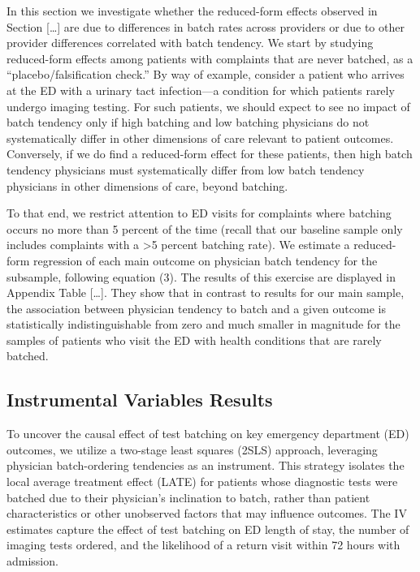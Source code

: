 \documentclass{article}
\begin{document}
In this section we investigate whether the reduced-form effects observed
in Section {[}\ldots{]} are due to differences in batch rates across
providers or due to other provider differences correlated with batch
tendency. We start by studying reduced-form effects among patients with
complaints that are never batched, as a ``placebo/falsification check.''
By way of example, consider a patient who arrives at the ED with a
urinary tact infection---a condition for which patients rarely undergo
imaging testing. For such patients, we should expect to see no impact of
batch tendency only if high batching and low batching physicians do not
systematically differ in other dimensions of care relevant to patient
outcomes. Conversely, if we do find a reduced-form effect for these
patients, then high batch tendency physicians must systematically differ
from low batch tendency physicians in other dimensions of care, beyond
batching.

To that end, we restrict attention to ED visits for complaints where
batching occurs no more than 5 percent of the time (recall that our
baseline sample only includes complaints with a \textgreater5 percent
batching rate). We estimate a reduced-form regression of each main
outcome on physician batch tendency for the subsample, following
equation (3). The results of this exercise are displayed in Appendix
Table {[}\ldots{]}. They show that in contrast to results for our main
sample, the association between physician tendency to batch and a given
outcome is statistically indistinguishable from zero and much smaller in
magnitude for the samples of patients who visit the ED with health
conditions that are rarely batched.

\hypertarget{instrumental-variables-results}{%
\subsection{Instrumental Variables
Results}\label{instrumental-variables-results}}

To uncover the causal effect of test batching on key emergency
department (ED) outcomes, we utilize a two-stage least squares (2SLS)
approach, leveraging physician batch-ordering tendencies as an
instrument. This strategy isolates the local average treatment effect
(LATE) for patients whose diagnostic tests were batched due to their
physician's inclination to batch, rather than patient characteristics or
other unobserved factors that may influence outcomes. The IV estimates
capture the effect of test batching on ED length of stay, the number of
imaging tests ordered, and the likelihood of a return visit within 72
hours with admission.
\end{document}
